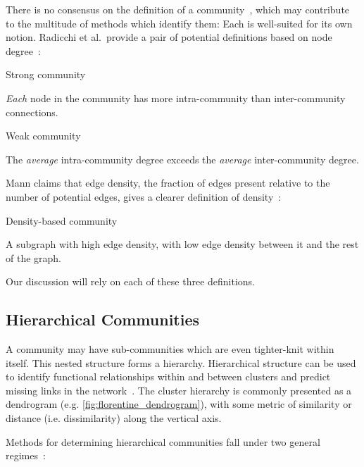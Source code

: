There is no consensus on the definition of a community~\cite{hu2008comparative}, which may contribute to the multitude of methods which identify them: Each is well-suited for its own notion. Radicchi et al.\ provide a pair of potential definitions based on node degree~\cite{radicchi2004defining}:
\begin{definition}Strong community

\emph{Each} node in the community has more intra-community than inter-community connections.\end{definition}

\begin{definition}Weak community

The \emph{average} intra-community degree exceeds the \emph{average} inter-community degree.
\end{definition}
Mann claims that edge density, the fraction of edges present relative to the number of potential edges, gives a clearer definition of density~\cite{mann2008extensions}:
\begin{definition}Density-based community

A subgraph with high edge density, with low edge density between it and the rest of the graph.

\end{definition}
Our discussion will rely on each of these three definitions.



\subsection{Hierarchical Communities}

A community may have sub-communities which are even tighter-knit within itself. This nested structure forms a hierarchy. Hierarchical structure can be used to identify functional relationships within and between clusters and predict missing links in the network~\cite{clauset2008hierarchical}. The cluster hierarchy is commonly presented as a dendrogram (e.g. \autoref{fig:florentine_dendrogram}), with some metric of similarity or distance (i.e. dissimilarity) along the vertical axis.

Methods for determining hierarchical communities fall under two general regimes~\cite{sneath1962numerical}:

